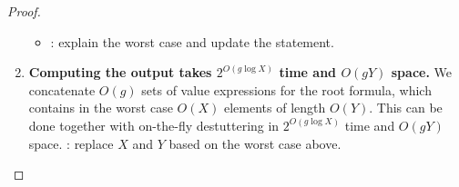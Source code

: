 \begin{proof}
\begin{enumerate}
\begin{itemize}
			\item
			\TODO: explain the worst case and update the statement.
			
			
			
		\end{itemize}

		\item
		\textbf{Computing the output takes $2^{O(g \log X)}$ time and $O(g Y)$ space.}
		We concatenate $O(g)$ sets of value expressions for the root formula, which contains in the worst case $O(X)$ elements of length $O(Y)$.
		This can be done together with on-the-fly destuttering in $2^{O(g \log X)}$ time and $O(g Y)$ space.
		\TODO: replace $X$ and $Y$ based on the worst case above.

	\end{enumerate}
	
%	
%	
	
%	
%	
%	
%	
%	
\end{proof}